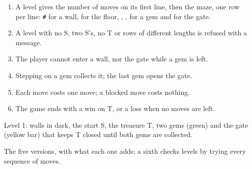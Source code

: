 \begin{enumerate}
  \item A level  gives the number of moves on its first line, then the
    maze, one row per line: \texttt{\#} for a wall,  for the floor,
    , ,  for a gem and \code{=} for the gate.
  \item A level with no S, two S's, no T or rows of different lengths is
    refused with a message.
  \item The player cannot enter a wall, nor the gate while a gem is left.
  \item Stepping on a gem collects it; the last gem opens the gate.
  \item Each move costs one move; a blocked move costs nothing.
  \item The game ends with a win on T, or a loss when no moves are left.
\end{enumerate}

\begin{omfigure}

{\small Level 1: walls in dark, the start S, the treasure T, two gems (green)
and the gate (yellow bar) that keeps T closed until both gems are collected.}
\end{omfigure}

\begin{omfigure}

{\small The five versions, with what each one adds; a sixth  checks
levels by trying every sequence of moves.}
\end{omfigure}

